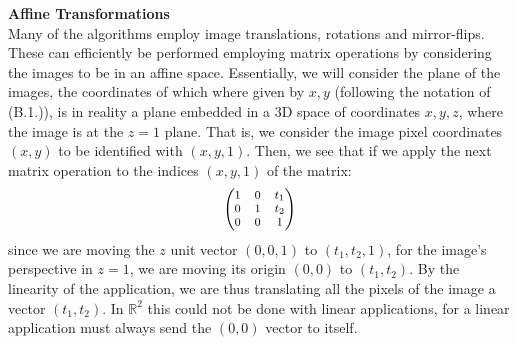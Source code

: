 \documentclass[11pt, a4paper, twoside]{article} %
\newcommand{\R}{\mathbb{R}} %
\DeclareRobustCommand{\mybox}[2][gray!10]{%
\begin{tcolorbox}[   %
        left=0.2cm,
        right=0.2cm,
        top=0.15cm,
        bottom=0.15cm,
        colback=#1,
        colframe=#1,
        width=\dimexpr\textwidth\relax, 
        enlarge left by=0mm,
        boxsep=5pt,
        arc=0pt,outer arc=0pt,
        ]
        #2
\end{tcolorbox}
}
\begin{document}
\mybox{{\bf Affine Transformations \vspace{0.2cm} \\}
Many of the algorithms employ image translations, rotations and mirror-flips. These can efficiently be performed employing matrix operations by considering the images to be in an affine space. Essentially, we will consider the plane of the images, the coordinates of which where given by $x,y$ (following the notation of (B.1.)), is in reality a plane embedded in a 3D space of coordinates $x,y,z$, where the image is at the $z=1$ plane. That is, we consider the image pixel coordinates $(x,y)$ to be identified with $(x,y,1)$. Then, we see that if we apply the next matrix operation to the indices $(x,y,1)$ of the matrix:
\begin{equation}
\footnotesize
\begin{pmatrix}
1 & 0 & t_1\\
0 & 1 & t_2 \\
0 & 0 & 1
\end{pmatrix}
\end{equation}
since we are moving the $z$ unit vector $(0,0,1)$ to $(t_1,t_2,1)$, for the image's perspective in $z=1$, we are moving its origin $(0,0)$ to $(t_1,t_2)$. By the linearity of the application, we are thus translating all the pixels of the image a vector $(t_1,t_2)$. In $\R^2$ this could not be done with linear applications, for a linear application must always send the $(0,0)$ vector to itself.\\

}
\end{document}
